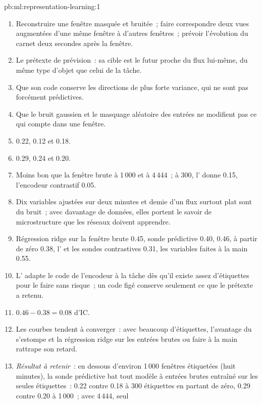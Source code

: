 \begin{solution}{pb:ml:representation-learning:1}
\begin{enumerate}
\item Reconstruire une fenêtre masquée et bruitée~; faire correspondre deux vues augmentées d'une même fenêtre à d'autres fenêtres~; prévoir l'évolution
du carnet deux secondes après la fenêtre.
\item Le prétexte de prévision~: sa cible est le futur proche du flux lui-même, du même type d'objet que celui de la tâche.
\item Que son code conserve les directions de plus forte variance, qui ne sont pas forcément prédictives.
\item Que le bruit gaussien et le masquage aléatoire des entrées ne modifient pas ce qui compte dans une fenêtre.
\item 0.22, 0.12 et 0.18.
\item 0.29, 0.24 et 0.20.
\item Moins bon que la fenêtre brute à 1\,000 et à 4\,444~; à 300, l' donne 0.15, l'encodeur contrastif 0.05.
\item Dix variables ajustées sur deux minutes et demie d'un flux surtout plat sont du bruit~; avec davantage de données, elles portent le
savoir de microstructure que les réseaux doivent apprendre.
\item Régression ridge sur la fenêtre brute 0.45, sonde prédictive 0.40,  0.46, à partir de zéro 0.38, l' et
les sondes contrastives 0.31, les variables faites à la main 0.55.
\item L' adapte le code de l'encodeur à la tâche dès qu'il existe assez d'étiquettes pour le faire sans risque~; un code figé conserve
seulement ce que le prétexte a retenu.
\item $0.46 - 0.38 = 0.08$ d'IC.
\item Les courbes tendent à converger~: avec beaucoup d'étiquettes, l'avantage du  s'estompe et la régression ridge sur les entrées brutes ou faire à la main rattrape
son retard.
\item \emph{Résultat à retenir}~: en dessous d'environ 1\,000 fenêtres étiquetées (huit minutes), la sonde prédictive bat tout modèle à entrées brutes
entraîné sur les seules étiquettes~: 0.22 contre 0.18 à 300 étiquettes en partant de zéro, 0.29 contre 0.20 à 1\,000~; avec 4\,444, seul

\end{enumerate}
\end{solution}
